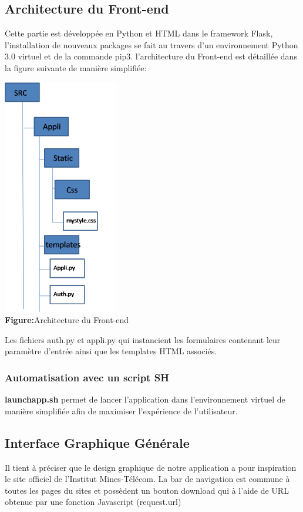  \subsection{Architecture du Front-end}
 Cette partie est développée en Python et HTML dans le framework Flask, l'installation de nouveaux packages se fait au travers d'un environnement Python 3.0 virtuel et de la commande pip3. l'architecture du Front-end est détaillée dans la figure suivante de manière simplifiée:
  \begin{center}
         \includegraphics[width=5cm]{archifront.png}\\
         \textbf{Figure:}Architecture du Front-end
         \end{center}
 Les fichiers auth.py et appli.py qui instancient les formulaires contenant leur paramètre d'entrée ainsi que les templates HTML associés.
\subsubsection{Automatisation avec un script SH}
\textbf{launchapp.sh} permet de lancer l'application dans l'environnement virtuel de manière simplifiée afin de maximiser l'expérience de l'utilisateur.
 \subsection{Interface Graphique Générale}
 Il tient à préciser que le design graphique de notre application a pour inspiration le site officiel de l'Institut Mines-Télécom. La bar de navigation est commune à toutes les pages du sites et possèdent un bouton download qui à l'aide de URL obtenue par une fonction Javascript (request.url)
